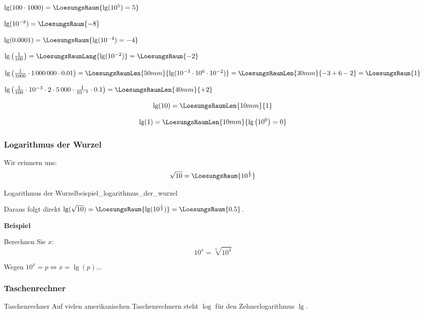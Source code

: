 $\lg(100 \cdot{} 1000) = \LoesungsRaum{\lg(10^5)=5}$
\leserluft{}

$\lg(10^{-8}) = \LoesungsRaum{-8}$
\leserluft{}

$\lg(0.0001) = \LoesungsRaum{\lg(10^{-4})=-4}$

$\lg\left(\frac1{100}\right) =\LoesungsRaumLang{\lg(10^{-2}) } = \LoesungsRaum{-2}$
\leserluft{}

$\lg\left(\frac1{1000}\cdot{} 1\,000\,000 \cdot{} 0.01\right)
=\LoesungsRaumLen{50mm}{\lg(10^{-3} \cdot{} 10^6 \cdot{} 10^{-2}) } =
\LoesungsRaumLen{30mm}{-3 + 6 - 2} = \LoesungsRaum{1}$

$\lg\left(\frac1{100}\cdot{}10^{-3}\cdot{}2\cdot{} 5\,000 \cdot{} \frac1{10^{-4}}\cdot{} 0.1\right) = \LoesungsRaumLen{40mm}{+2}$

\newpage



\begin{gesetz}{}{}
$$\lg(10) = \LoesungsRaumLen{10mm}{1}$$
\end{gesetz}

\begin{gesetz}{}{}
$$\lg(1) = \LoesungsRaumLen{10mm}{\lg\left(10^0\right) = 0}$$
\end{gesetz}


\subsubsection{Logarithmus der Wurzel}
Wir erinnern uns: $$\sqrt{10} =\LoesungsRaum{ 10^\frac12}$$
\begin{beispiel}{Logarithmus der
    Wurzel}{beispiel_logarithmus_der_wurzel}

  Daraus folgt direkt $\lg(\sqrt{10}) = \LoesungsRaum{\lg(10^\frac12)}  = \LoesungsRaum{0.5}$.
\end{beispiel}


\textbf{Beispiel}

Berechnen Sie $x$:
$$10^x = \sqrt[3]{10^4}$$


Wegen $10^x = p \Longleftrightarrow x=\lg(p)$...


  \newpage
  \subsubsection{Taschenrechner}
\begin{bemerkung}{Taschenrechner}{}
  Auf vielen amerikanischen Taschenrechnern steht $\log$ für den Zehnerlogarithmus $\lg$.

  
  \end{bemerkung}

